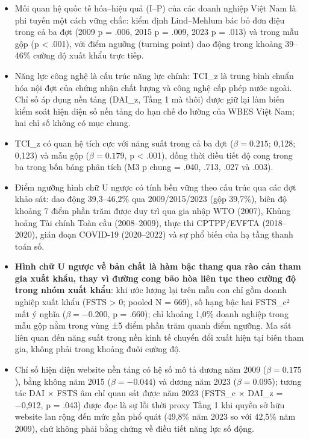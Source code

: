 \documentclass[12pt,a4paper]{article}
\begin{document}
\begin{itemize}
\item
  Mối quan hệ quốc tế hóa--hiệu quả (I--P) của các doanh nghiệp Việt Nam
  là phi tuyến một cách vững chắc: kiểm định Lind--Mehlum bác bỏ đơn
  điệu trong cả ba đợt (2009 p = .006, 2015 p = .009, 2023 p = .013) và
  trong mẫu gộp (p \textless{} .001), với điểm ngưỡng (turning point)
  dao động trong khoảng 39--46\% cường độ xuất khẩu trực tiếp.
\item
  Năng lực công nghệ là cấu trúc năng lực chính: TCI\_z là trung bình
  chuẩn hóa nội đợt của chứng nhận chất lượng và công nghệ cấp phép nước
  ngoài. Chỉ số áp dụng nền tảng (DAI\_z, Tầng 1 mà thôi) được giữ lại
  làm biến kiểm soát hiện diện số nền tảng do hạn chế đo lường của WBES
  Việt Nam; hai chỉ số không có mục chung.
\item
  TCI\_z có quan hệ tích cực với năng suất trong cả ba đợt
  (\(\beta = 0.215\); 0,128; 0,123) và mẫu gộp (\(\beta = 0.179\), p
  \textless{} .001), đồng thời điều tiết độ cong trong ba trong bốn bảng
  phân tích (M3 p chung = .040, .713, .027 và .003).
\item
  Điểm ngưỡng hình chữ U ngược có tính bền vững theo cấu trúc qua các
  đợt khảo sát: dao động 39,3--46,2\% qua 2009/2015/2023 (gộp 39,7\%),
  biên độ khoảng 7 điểm phần trăm được duy trì qua gia nhập WTO (2007),
  Khủng hoảng Tài chính Toàn cầu (2008--2009), thực thi CPTPP/EVFTA
  (2018--2020), gián đoạn COVID-19 (2020--2022) và sự phổ biến của hạ
  tầng thanh toán số.
\item
  \textbf{Hình chữ U ngược về bản chất là hàm bậc thang qua rào cản tham
  gia xuất khẩu, thay vì đường cong bão hòa liên tục theo cường độ trong
  nhóm xuất khẩu}: khi ước lượng lại trên mẫu con chỉ gồm doanh nghiệp
  xuất khẩu (FSTS \textgreater{} 0; pooled N = 669), số hạng bậc hai
  FSTS\_c² mất ý nghĩa (\(\beta = −0.200\), p = .660); chỉ khoảng 1,0\%
  doanh nghiệp trong mẫu gộp nằm trong vùng ±5 điểm phần trăm quanh điểm
  ngưỡng. Ma sát liên quan đến năng suất trong nền kinh tế chuyển đổi
  xuất hiện tại biên tham gia, không phải trong khoảng đuôi cường độ.
\item
  Chỉ số hiện diện website nền tảng có hệ số mô tả dương năm 2009
  (\(\beta = 0.175\)), bằng không năm 2015 (\(\beta = −0.044\)) và dương
  năm 2023 (\(\beta = 0.095\)); tương tác DAI × FSTS âm chỉ quan sát
  được năm 2023 (FSTS\_c × DAI\_z = −0,912, p = .043) được đọc là sự lỗi
  thời proxy Tầng 1 khi quyền sở hữu website lan rộng đến mức gần phổ
  quát (49,8\% năm 2023 so với 42,5\% năm 2009), chứ không phải bằng
  chứng về điều tiết năng lực số động.
\end{itemize}
\end{document}
